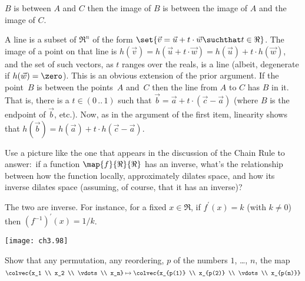 \begin{exercises}
\begin{exparts}
         $B$ is between $A$ and $C$ then the image of $B$ is between the
         image of $A$ and the image of $C$.
    \end{exparts}
    \begin{answer}
      \begin{exparts}
        \partsitem A line is a subset of $\Re^n$ of the form
          $\set{\vec{v}=\vec{u}+t\cdot\vec{w}\suchthat t\in\Re}$.
          The image of a point on that line is 
          $h(\vec{v})=h(\vec{u}+t\cdot\vec{w})=h(\vec{u})+t\cdot h(\vec{w})$,
          and the set of such vectors, as $t$ ranges over the reals, is
          a line (albeit, degenerate if $h(\vec{w})=\zero$).
        \partsitem This is an obvious extension of the prior argument.
        \partsitem If the point~$B$ is between the points~$A$ and~$C$ then the
          line from $A$ to $C$ has $B$ in it.
          That is, there is a $t\in (0\,..\,1)$ such that
          $\vec{b}=\vec{a}+t\cdot (\vec{c}-\vec{a})$ (where $B$ is the
          endpoint of $\vec{b}$, etc.).
          Now, as in the argument of the first item, linearity shows that
          $h(\vec{b})=h(\vec{a})+t\cdot h(\vec{c}-\vec{a})$.  
      \end{exparts}
    \end{answer}
  \item 
    Use a picture like the one 
    that appears in the discussion of the Chain Rule
    to answer:~if a function $\map{f}{\Re}{\Re}$ has an inverse,
    what's the relationship between how the function \Dash locally, 
    approximately \Dash  dilates space, and
    how its inverse dilates space (assuming, of course, that it has an 
    inverse)?
    \begin{answer}
      The two are inverse.
      For instance, for a fixed $x\in\Re$,
      if $f^\prime (x)=k$ (with $k\neq 0$) then 
      $(f^{-1})^\prime (x)=1/k$.
      \begin{center}
        \texttt{[image: ch3.98]}
     \end{center}
    \end{answer}
  \item \label{exer:PermIsCompSwaps}
    Show that any permutation, any reordering, $p$ of the numbers
    $1$, \ldots, $n$, the map 
    \begin{equation*}
      \colvec{x_1 \\ x_2 \\ \vdots\\ x_n}
      \mapsto
      \colvec{x_{p(1)} \\ x_{p(2)} \\ \vdots \\ x_{p(n)}}

\end{equation*}
\end{exercises}
